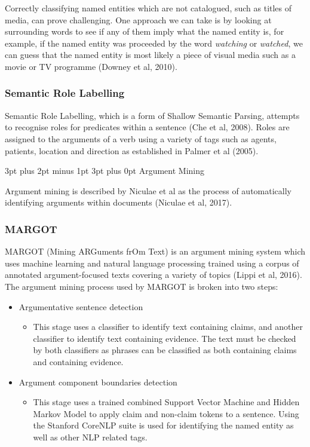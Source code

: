 \documentclass[12pt,a4paper]{article}
\makeatletter
\renewcommand\subsection{\@startsection {subsection}{1}{2mm} %
                               {3pt plus 2pt minus 1pt} %
                               {3pt plus 0pt} %
                               {\normalfont\bfseries}}
\makeatother
\begin{document}
Correctly classifying named entities which are not catalogued, such as titles of media, can prove challenging. One approach we can take is by looking at surrounding words to see if any of them imply what the named entity is, for example, if the named entity was proceeded by the word \emph{watching} or \emph{watched}, we can guess that the named entity is most likely a piece of visual media such as a movie or TV programme (Downey et al, 2010).

\subsubsection{Semantic Role Labelling}

Semantic Role Labelling, which is a form of Shallow Semantic Parsing, attempts to recognise roles for predicates within a sentence (Che et al, 2008). Roles are assigned to the arguments of a verb using a variety of tags such as agents, patients, location and direction as established in Palmer et al (2005).

\subsection{Argument Mining}

Argument mining is described by Niculae et al as the process of automatically identifying arguments within documents (Niculae et al, 2017).

\subsubsection{MARGOT}

MARGOT (Mining ARGuments frOm Text) is an argument mining system which uses machine learning and natural language processing trained using a corpus of annotated argument-focused texts covering a variety of topics (Lippi et al, 2016). The argument mining process used by MARGOT is broken into two steps:

\begin{itemize}
    \item Argumentative sentence detection
    \begin{itemize}
        \item This stage uses a classifier to identify text containing claims, and another classifier to identify text containing evidence. The text must be checked by both classifiers as phrases can be classified as both containing claims and containing evidence.
    \end{itemize}
    \item Argument component boundaries detection
    \begin{itemize}
        \item This stage uses a trained combined Support Vector Machine and Hidden Markov Model to apply claim and non-claim tokens to a sentence. Using the Stanford CoreNLP suite is used for identifying the named entity as well as other NLP related tags. 
    \end{itemize}
\end{itemize}
\end{document}
